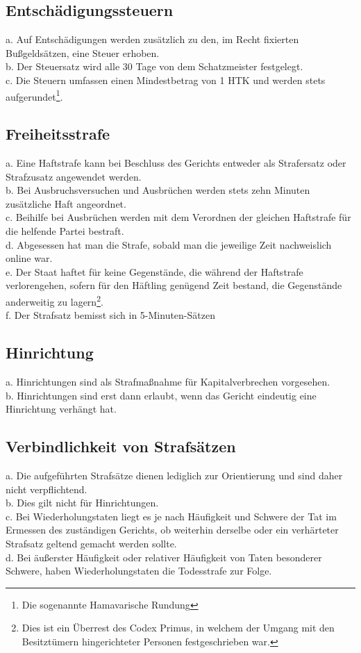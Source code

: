 \documentclass{article}
\begin{document}
\subsection{Entschädigungssteuern}
a. Auf Entschädigungen werden zusätzlich zu den, im Recht fixierten Bußgeldsätzen, eine Steuer erhoben.\\ 
b. Der Steuersatz wird alle 30 Tage von dem Schatzmeister festgelegt.\\
c. Die Steuern umfassen einen Mindestbetrag von 1 HTK und werden stets aufgerundet\footnote{Die sogenannte Hamavarische Rundung}.

\subsection{Freiheitsstrafe}
a. Eine Haftstrafe kann bei Beschluss des Gerichts entweder als Strafersatz oder Strafzusatz angewendet werden.\\
b. Bei Ausbruchsversuchen und Ausbrüchen werden stets zehn Minuten zusätzliche Haft angeordnet.\\
c. Beihilfe bei Ausbrüchen werden mit dem Verordnen der gleichen Haftstrafe für die helfende Partei bestraft.\\
d. Abgesessen hat man die Strafe, sobald man die jeweilige Zeit nachweislich online war.\\
e. Der Staat haftet für keine Gegenstände, die während der Haftstrafe verlorengehen, sofern für den Häftling genügend Zeit bestand, die Gegenstände anderweitig zu lagern\footnote{Dies ist ein Überrest des Codex Primus, in welchem der Umgang mit den Besitztümern hingerichteter Personen festgeschrieben war.}.\\
f. Der Strafsatz bemisst sich in 5-Minuten-Sätzen

\subsection{Hinrichtung}
a. Hinrichtungen sind als Strafmaßnahme für Kapitalverbrechen vorgesehen.\\
b. Hinrichtungen sind erst dann erlaubt, wenn das Gericht eindeutig eine Hinrichtung verhängt hat.

\subsection{Verbindlichkeit von Strafsätzen}
a. Die aufgeführten Strafsätze dienen lediglich zur Orientierung und sind daher nicht verpflichtend.\\
b. Dies gilt nicht für Hinrichtungen.\\
c. Bei Wiederholungstaten liegt es je nach Häufigkeit und Schwere der Tat im Ermessen des zuständigen Gerichts, ob weiterhin derselbe oder ein verhärteter Strafsatz geltend gemacht werden sollte.\\
d. Bei äußerster Häufigkeit oder relativer Häufigkeit von Taten besonderer Schwere, haben Wiederholungstaten die Todesstrafe zur Folge.
\end{document}
